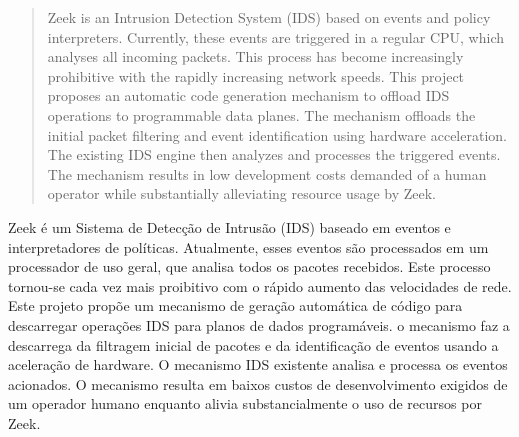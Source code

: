 \begin{abstract}
Zeek is an Intrusion Detection System (IDS) based on events and policy interpreters. Currently, these events are triggered in a regular CPU, which analyses all incoming packets. This process has become increasingly prohibitive with the rapidly increasing network speeds. This project proposes an automatic code generation mechanism to offload IDS operations to programmable data planes. The mechanism offloads the initial packet filtering and event identification using hardware acceleration. The existing IDS engine then analyzes and processes the triggered events. The mechanism results in low development costs demanded of a human operator while substantially alleviating resource usage by Zeek.
\end{abstract}

\begin{translatedabstract}
Zeek é um Sistema de Detecção de Intrusão (IDS) baseado em eventos e interpretadores de políticas. Atualmente, esses eventos são processados em um processador de uso geral, que analisa todos os pacotes recebidos. Este processo tornou-se cada vez mais proibitivo com o rápido aumento das velocidades de rede. Este projeto propõe um mecanismo de geração automática de código para descarregar operações IDS para planos de dados programáveis. o mecanismo faz a descarrega da filtragem inicial de pacotes e da identificação de eventos usando a aceleração de hardware. O mecanismo IDS existente analisa e processa os eventos acionados. O mecanismo resulta em baixos custos de desenvolvimento exigidos de um operador humano enquanto alivia substancialmente o uso de recursos por Zeek.
\end{translatedabstract}
